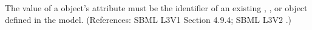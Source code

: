 The value of a \RateRule object's  attribute must be the
identifier of an existing \Species, \Compartment, \Parameter or
\SpeciesReference object defined in the model.  (References: SBML L3V1 Section 4.9.4; SBML L3V2
.)

